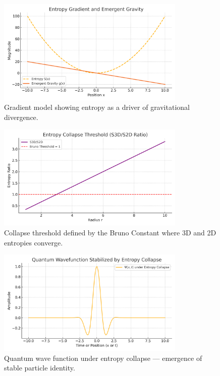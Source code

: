 \documentclass[12pt]{article}
\begin{document}
\begin{figure}[H]
\centering
\includegraphics[width=0.8\textwidth]{fig_03_gradient_model.png}
\caption{Gradient model showing entropy as a driver of gravitational divergence.}
\label{fig_03_gradient_model}
\end{figure}

\begin{figure}[H]
\centering
\includegraphics[width=0.8\textwidth]{fig_04_collapse_threshold.png}
\caption{Collapse threshold defined by the Bruno Constant where 3D and 2D entropies converge.}
\label{fig_04_collapse_threshold}
\end{figure}

\begin{figure}[H]
\centering
\includegraphics[width=0.8\textwidth]{fig_05_wavefunction_stability.png}
\caption{Quantum wave function under entropy collapse — emergence of stable particle identity.}
\label{fig_05_wavefunction_stability}
\end{figure}
\end{document}
